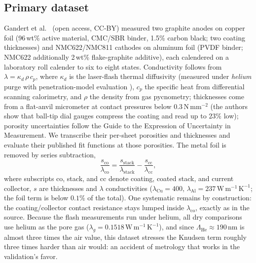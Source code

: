 \documentclass[10pt,a4paper]{article}
\newcommand{\lamg}{\lambda_{g}}
\newcommand{\WmK}{\,\mathrm{W\,m^{-1}\,K^{-1}}}
\begin{document}
\subsection{Primary dataset}
\label{sec:data:primary}
Gandert et al.\ \cite{gandert2023} (open access, CC-BY) measured two graphite anodes on copper foil (96\,wt\% active material, CMC/SBR binder, 1.5\% carbon black; two coating thicknesses) and NMC622/NMC811 cathodes on aluminum foil (PVDF binder; NMC622 additionally 2\,wt\% flake-graphite additive), each calendered on a laboratory roll calender to six to eight states. Conductivity follows from $\lambda=\kappa_d\,\rho\,c_p$, where $\kappa_d$ is the laser-flash thermal diffusivity (measured under \emph{helium} purge with penetration-model evaluation \cite{mcmasters}), $c_p$ the specific heat from differential scanning calorimetry, and $\rho$ the density from gas pycnometry; thicknesses come from a flat-anvil micrometer at contact pressures below $0.3\,\mathrm{N\,mm^{-2}}$ (the authors show that ball-tip dial gauges compress the coating and read up to $23\%$ low); porosity uncertainties follow the Guide to the Expression of Uncertainty in Measurement. We transcribe their per-sheet porosities and thicknesses and evaluate their published fit functions at those porosities. The metal foil is removed by series subtraction,
\begin{equation}
\frac{s_{\mathrm{co}}}{\lambda_{\mathrm{co}}}
=\frac{s_{\mathrm{stack}}}{\lambda_{\mathrm{stack}}}-\frac{s_{\mathrm{cc}}}{\lambda_{\mathrm{cc}}},
\label{eq:stack}
\end{equation}
where subscripts co, stack, and cc denote coating, coated stack, and current collector, $s$ are thicknesses and $\lambda$ conductivities ($\lambda_{\mathrm{Cu}}=400$, $\lambda_{\mathrm{Al}}=237\WmK$; the foil term is below $0.1\%$ of the total). One systematic remains by construction: the coating/collector contact resistance stays lumped inside $\lambda_{\mathrm{co}}$, exactly as in the source. Because the flash measurements run under helium, all dry comparisons use helium as the pore gas ($\lamg=0.1518\WmK$), and since $\Lambda_{\mathrm{He}}\approx190$\,nm is almost three times the air value, this dataset stresses the Knudsen term roughly three times harder than air would: an accident of metrology that works in the validation's favor.
\end{document}
